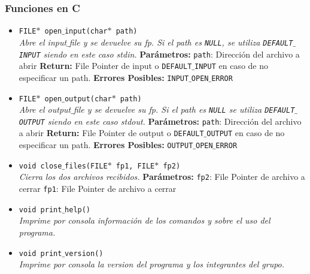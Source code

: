 \documentclass[a4paper, 10pt]{article}
\def\code#1{\texttt{#1}}
\begin{document}
			\subsubsection{Funciones en C}	
			\begin{itemize}

				\item \code{FILE$*$ open$\_$input(char$*$ path)}
				\\\textit{Abre el input$\_$file y se devuelve su fp.
				Si el path es \code{NULL},
				se utiliza \code{DEFAULT$\_$INPUT} siendo en este caso stdin.}
					\subitem \textbf{Parámetros:}
						\subsubitem \code{path}: Dirección del archivo a abrir
					\subitem \textbf{Return:}
						\subsubitem File Pointer de input o \code{DEFAULT$\_$INPUT}
						en caso de no especificar un path.
					\subitem \textbf{Errores Posibles:}
						\subsubitem \code{INPUT$\_$OPEN$\_$ERROR}

				\item \code{FILE$*$ open$\_$output(char$*$ path)}
				\\\textit{Abre el output$\_$file y se devuelve su fp. Si el path es \code{NULL}
				se utiliza \code{DEFAULT$\_$OUTPUT} siendo en este caso stdout.}
					\subitem \textbf{Parámetros:}
						\subsubitem \code{path}: Dirección del archivo a abrir
					\subitem \textbf{Return:}
						\subsubitem File Pointer de output o \code{DEFAULT$\_$OUTPUT} en caso de
						no especificar un path.
					\subitem \textbf{Errores Posibles:}
						\subsubitem \code{OUTPUT$\_$OPEN$\_$ERROR}

				\item \code{void close$\_$files(FILE$*$ fp1, FILE$*$ fp2)}
				\\\textit{Cierra los dos archivos recibidos.}
					\subitem \textbf{Parámetros:}
						\subsubitem \code{fp2}: File Pointer de archivo a cerrar
						\subsubitem \code{fp1}: File Pointer de archivo a cerrar

				\item \code{void print$\_$help()}
				\\\textit{Imprime por consola información de los comandos y sobre el
				uso del programa.}

				\item \code{void print$\_$version()}
				\\\textit{Imprime por consola la version del programa y los integrantes del grupo.}


\end{itemize}
\end{document}
